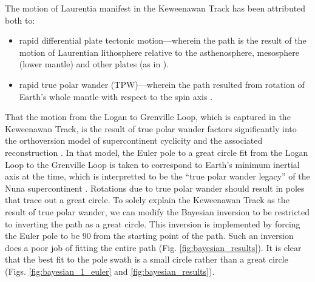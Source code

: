 \documentclass[11pt,letterpaper]{article}
\begin{document}
The motion of Laurentia manifest in the Keweenawan Track has been attributed both to:
\begin{itemize}
\item rapid differential plate tectonic motion---wherein the path is the result of the motion of Laurentian lithosphere relative to the asthenosphere, mesosphere (lower mantle) and other plates (as in \citealp{Davis1997a}).
\item rapid true polar wander (TPW)---wherein the path resulted from rotation of Earth's whole mantle with respect to the spin axis \citep{Evans2003b}.
\end{itemize}
That the motion from the Logan to Grenville Loop, which is captured in the Keweenawan Track, is the result of true polar wander factors significantly into the orthoversion model of supercontinent cyclicity and the associated reconstruction \citep{Mitchell2012a}. In that model, the Euler pole to a great circle fit from the Logan Loop to the Grenville Loop is taken to correspond to Earth's minimum inertial axis at the time, which is interpretted to be the ``true polar wander legacy'' of the Nuna supercontinent \citep{Evans2003b}. Rotations due to true polar wander should result in poles that trace out a great circle. To solely explain the Keweenawan Track as the result of true polar wander, we can modify the Bayesian inversion to be restricted to inverting the path as a great circle. This inversion is implemented by forcing the Euler pole to be 90\textdegree$\;$from the starting point of the path. Such an inversion does a poor job of fitting the entire path (Fig. \ref{fig:bayesian_results}). It is clear that the best fit to the pole swath is a small circle rather than a great circle (Figs. \ref{fig:bayesian_1_euler} and \ref{fig:bayesian_results}).
\end{document}
